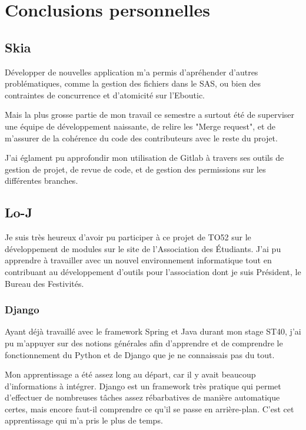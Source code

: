\documentclass[a4paper]{report}
\begin{document}
\chapter{Conclusions personnelles}
\section{Skia}
\label{sec:skia}
\par Développer de nouvelles application m'a permis d'apréhender d'autres problématiques, comme la gestion des fichiers
dans le SAS, ou bien des contraintes de concurrence et d'atomicité sur l'Eboutic.

\par Mais la plus grosse partie de mon travail ce semestre a surtout été de superviser une équipe de développement
naissante, de relire les "Merge request", et de m'assurer de la cohérence du code des contributeurs avec le reste du
projet.

\par J'ai églament pu approfondir mon utilisation de Gitlab à travers ses outils de gestion de projet, de revue de code,
et de gestion des permissions sur les différentes branches.

\section{Lo-J}
\label{sec:lo_j}
\par Je suis très heureux d’avoir pu participer à ce projet de TO52 sur le développement de modules sur le site de l’Association des Étudiants. J’ai pu apprendre à travailler avec un nouvel environnement informatique tout en contribuant au développement d’outils pour l’association dont je suis Président, le Bureau des Festivités.

\subsection{Django}
\par Ayant déjà travaillé avec le framework Spring et Java durant mon stage ST40, j’ai pu m’appuyer sur des notions générales afin d’apprendre et de comprendre le fonctionnement du Python et de Django que je ne connaissais pas du tout. 

\par Mon apprentissage a été assez long au départ, car il y avait beaucoup d’informations à intégrer. Django est un framework très pratique qui permet d’effectuer de nombreuses tâches assez rébarbatives de manière automatique certes, mais encore faut-il comprendre ce qu’il se passe en arrière-plan. C’est cet apprentissage qui m’a pris le plus de temps.
\end{document}
